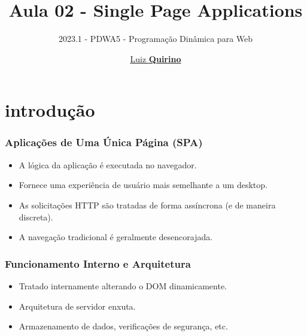 \documentclass{beamer}
\title{Aula 02 - Single Page Applications}
\subtitle{2023.1 - PDWA5 - Programação Dinâmica para Web}
\author{\href{mailto:luiz.quirino@ifsp.edu.br}{Luiz \textbf{Quirino}}}
\newcommand{\hrefcol}[2]{\textcolor{cyan}{\href{#1}{#2}}}
\begin{document}
\maketitle

%
%


\section{introdução}
\begin{frame}
      \frametitle{Aplicações de Uma Única Página (SPA)}
      \begin{itemize}
            \item A lógica da aplicação é executada no navegador.
            \item Fornece uma experiência de usuário mais semelhante a um desktop.
            \item As solicitações HTTP são tratadas de forma assíncrona (e de maneira discreta).
            \item A navegação tradicional é geralmente desencorajada.
      \end{itemize}
\end{frame}

\begin{frame}
      \frametitle{Funcionamento Interno e Arquitetura}
      \begin{itemize}
            \item Tratado internamente alterando o DOM dinamicamente.
            \item Arquitetura de servidor enxuta.
            \item Armazenamento de dados, verificações de segurança, etc.
      \end{itemize}
\end{frame}
\end{document}
